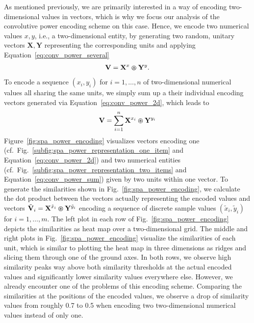 As mentioned previously, we are primarily interested in a way of encoding two-dimensional values in vectors, which is why we focus our analysis of the convolutive power encoding scheme on this case.
Hence, we encode two numerical values $x,y$, i.e., a two-dimensional entity, by generating two random, unitary vectors $ \mathbf{X}, \mathbf{Y} $ representing the corresponding units and applying Equation~\eqref{eq:conv_power_several} 
\begin{equation}
\label{eq:conv_power_2d}
\mathbf{V} = \mathbf{X}^{x} \varoast \mathbf{Y}^{y}.
\end{equation}
To encode a sequence $ \left(x_{i}, y_{i}\right) $ for $i=1, \ldots, n$ of two-dimensional numerical values all sharing the same units, we simply sum up a their individual encoding vectors generated via Equation~\eqref{eq:conv_power_2d}, which leads to
\begin{equation}
\label{eq:conv_power_sum}
\mathbf{V} = \sum\limits_{i=1}^{n} \mathbf{X}^{x_i} \varoast \mathbf{Y}^{y_i}
\end{equation}
Figure~\ref{fig:spa_power_encoding} visualizes vectors encoding one (cf.\ Fig.~\ref{subfig:spa_power_representation_one_item} and Equation~\eqref{eq:conv_power_2d}) and two numerical entities (cf.\ Fig.~\ref{subfig:spa_power_representation_two_items} and Equation~\eqref{eq:conv_power_sum}) given by two units within one vector.
To generate the similarities shown in Fig.~\ref{fig:spa_power_encoding}, we calculate the dot product between the vectors actually representing the encoded values and vectors $ \tilde{\mathbf{V}}_{i} = \mathbf{X}^{\tilde{x}_{i}} \varoast \mathbf{Y}^{\tilde{y}_i} $ encoding a sequence of discrete sample values $ \left( \tilde{x}_{i}, \tilde{y}_{i} \right)$ for $i=1, \ldots, m$.
The left plot in each row of Fig.~\ref{fig:spa_power_encoding} depicts the similarities as heat map over a two-dimensional grid. 
The middle and right plots in Fig.~\ref{fig:spa_power_encoding} visualize the similarities of each unit, which is similar to plotting the heat map in three dimensions as ridges and slicing them through one of the ground axes.
In both rows, we observe high similarity peaks way above both similarity thresholds at the actual encoded values and significantly lower similarity values everywhere else.
However, we already encounter one of the problems of this encoding scheme.
Comparing the similarities at the positions of the encoded values, we observe a drop of similarity values from roughly \num{0.7} to \num{0.5} when encoding two two-dimensional numerical values instead of only one.
